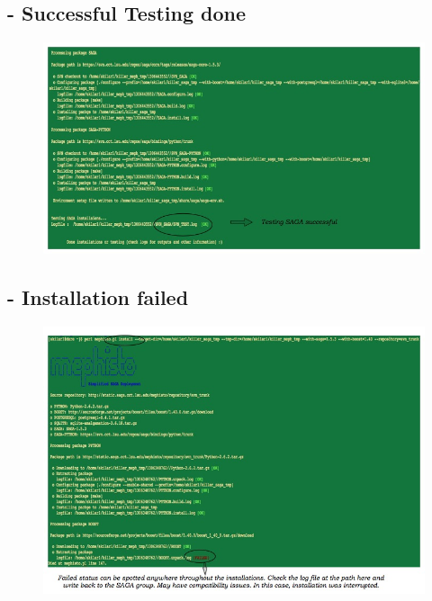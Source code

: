 \documentclass[a4paper,10pt]{article}
\begin{document}
\subsection*{- Successful Testing done}
\begin{figure}[H]
\begin{center}
\includegraphics[scale=0.60]{test_succ}
\end{center}
\end{figure}
\subsection*{- Installation failed}
\begin{figure}[H]
\begin{center}
\includegraphics[scale=0.60]{install_fail.jpg}
\end{center}
\end{figure}
\end{document}
